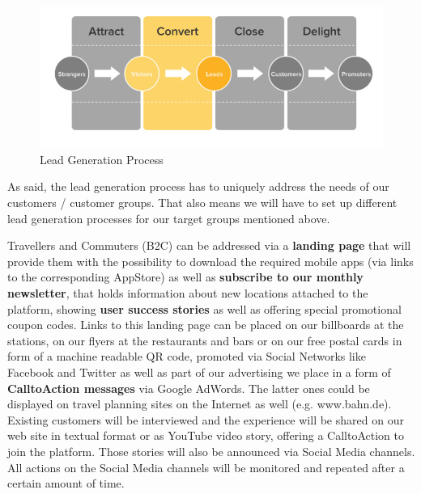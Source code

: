 \documentclass[a4paper]{article}
\begin{document}
\begin{figure}[!ht]
    \center
        \includegraphics[width=\textwidth]{From_Strangers_to_Promoters.png}
    \caption{Lead Generation Process}
    \label{fig:leadgen}
\end{figure}

As said, the lead generation process has to uniquely address the needs of our customers / customer groups. That also means we will have to set up different lead generation processes for our target groups mentioned above. \par \vspace{0.2cm}
Travellers and Commuters (B2C) can be addressed via a \textbf{landing page} that will provide them with  the  possibility  to  download  the  required  mobile  apps  (via  links  to  the  corresponding AppStore) as well as \textbf{subscribe to our monthly newsletter}, that holds information about new locations attached to the platform, showing \textbf{user success stories} as well as offering special promotional coupon codes. Links to this landing page can be placed on our billboards at the stations, on our flyers at the restaurants and bars or on our free postal cards in form of a machine readable QR code, promoted via Social Networks like Facebook and Twitter as well as part of our advertising we place  in a form of \textbf{Call­to­Action messages} via Google AdWords. The latter ones could be displayed on travel planning sites on the Internet as well (e.g. www.bahn.de). Existing customers will be interviewed and the experience will be shared on our web site in textual format or as YouTube video story, offering a Call­to­Action to join the platform. Those stories  will  also  be  announced  via  Social  Media  channels.  All  actions  on  the Social Media channels will be monitored and repeated after a certain amount of time. \par \vspace{0.2cm}
\end{document}
